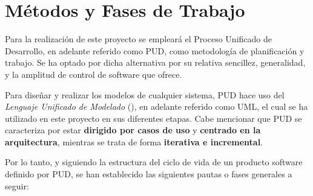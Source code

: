 
\newpage
\section{Métodos y Fases de Trabajo}
\label{sec:methods}

\justifying \setlength{\parindent}{1.27cm}
\normalsize\mdseries

Para la realización de este proyecto se empleará el Proceso Unificado de Desarrollo, en adelante referido como PUD, como metodología de planificación y trabajo. Se ha optado por dicha alternativa por su relativa sencillez, generalidad, y la amplitud de control de software que ofrece.\newline

Para diseñar y realizar los modelos de cualquier sistema, PUD hace uso del \textit{Lenguaje Unificado de Modelado} (\cite{uml.01}), en adelante referido como UML, el cual se ha utilizado en este proyecto en sus diferentes etapas. Cabe mencionar que PUD se caracteriza por estar \textbf{dirigido por casos de uso} y \textbf{centrado en la arquitectura}, mientras se trata de forma \textbf{iterativa e incremental}.\newline

Por lo tanto, y siguiendo la estructura del ciclo de vida de un producto software definido por PUD, se han establecido las siguientes pautas o fases generales a seguir:


